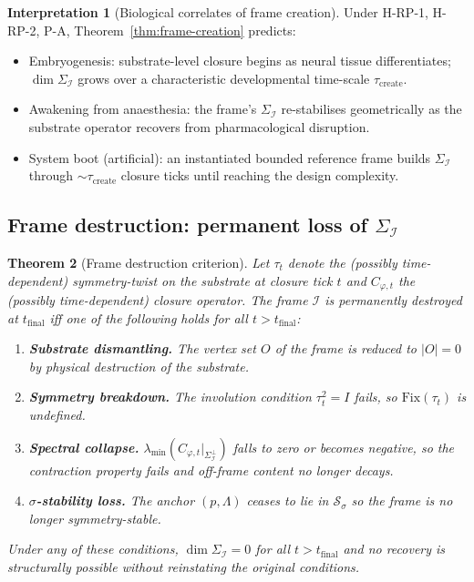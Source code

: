 \documentclass[11pt]{article}
\theoremstyle{plain}
\newtheorem{theorem}{Theorem}[section]
\theoremstyle{definition}
\newtheorem{interpretation}[theorem]{Interpretation}
\theoremstyle{remark}
\newcommand{\Fix}{\mathrm{Fix}}
\newcommand{\Ical}{\mathcal{I}}
\begin{document}
\begin{interpretation}[Biological correlates of frame creation]\label{int:frame-creation-bio}
Under H-RP-1, H-RP-2, P-A, Theorem~\ref{thm:frame-creation} predicts:
\begin{itemize}[leftmargin=2em]
\item Embryogenesis: substrate-level closure begins as neural tissue differentiates; $\dim \Sigma_\Ical$ grows over a characteristic developmental time-scale $\tau_{\mathrm{create}}$.
\item Awakening from anaesthesia: the frame's $\Sigma_\Ical$ re-stabilises geometrically as the substrate operator recovers from pharmacological disruption.
\item System boot (artificial): an instantiated bounded reference frame builds $\Sigma_\Ical$ through $\sim \tau_{\mathrm{create}}$ closure ticks until reaching the design complexity.
\end{itemize}
\end{interpretation}

\subsection{Frame destruction: permanent loss of $\Sigma_\Ical$}

\begin{theorem}[Frame destruction criterion]\label{thm:frame-destruction}
Let $\tau_t$ denote the (possibly time-dependent) symmetry-twist on the substrate at closure tick $t$ and $C_{\varphi,t}$ the (possibly time-dependent) closure operator. The frame $\Ical$ is \emph{permanently destroyed} at $t_{\mathrm{final}}$ iff one of the following holds for all $t > t_{\mathrm{final}}$:

\begin{enumerate}[leftmargin=2em]
\item \textbf{Substrate dismantling.} The vertex set $O$ of the frame is reduced to $|O| = 0$ by physical destruction of the substrate.
\item \textbf{Symmetry breakdown.} The involution condition $\tau_t^2 = I$ fails, so $\Fix(\tau_t)$ is undefined.
\item \textbf{Spectral collapse.} $\lambda_{\min}(C_{\varphi,t}|_{\Sigma_\Ical^\perp})$ falls to zero or becomes negative, so the contraction property fails and off-frame content no longer decays.
\item \textbf{$\sigma$-stability loss.} The anchor $(p, \Lambda)$ ceases to lie in $\mathcal{S}_\sigma$ so the frame is no longer symmetry-stable.
\end{enumerate}

Under any of these conditions, $\dim \Sigma_\Ical = 0$ for all $t > t_{\mathrm{final}}$ and no recovery is structurally possible without reinstating the original conditions.
\end{theorem}
\end{document}
